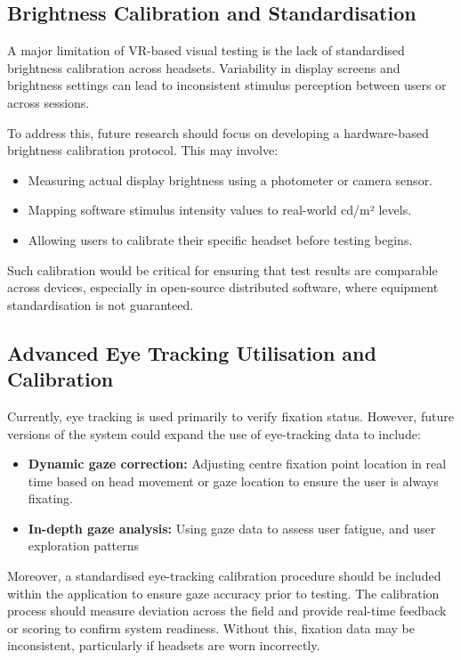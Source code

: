 \documentclass{l4proj}
\begin{document}
\subsection{Brightness Calibration and Standardisation}
A major limitation of VR-based visual testing is the lack of standardised brightness calibration across headsets. Variability in display screens and brightness settings can lead to inconsistent stimulus perception between users or across sessions.

To address this, future research should focus on developing a hardware-based brightness calibration protocol. This may involve:

\begin{itemize}
    \item Measuring actual display brightness using a photometer or camera sensor.
    \item Mapping software stimulus intensity values to real-world cd/m² levels.
    \item Allowing users to calibrate their specific headset before testing begins.
\end{itemize}

Such calibration would be critical for ensuring that test results are comparable across devices, especially in open-source distributed software, where equipment standardisation is not guaranteed.

\subsection{Advanced Eye Tracking Utilisation and Calibration}
Currently, eye tracking is used primarily to verify fixation status. However, future versions of the system could expand the use of eye-tracking data to include:

\begin{itemize}
    \item \textbf{Dynamic gaze correction:} Adjusting centre fixation point location in real time based on head movement or gaze location to ensure the user is always fixating.
 
    \item \textbf{In-depth gaze analysis:} Using gaze data to assess user fatigue, and user exploration patterns
\end{itemize}

Moreover, a standardised eye-tracking calibration procedure should be included within the application to ensure gaze accuracy prior to testing. The calibration process should measure deviation across the field and provide real-time feedback or scoring to confirm system readiness. Without this, fixation data may be inconsistent, particularly if headsets are worn incorrectly.
\end{document}
